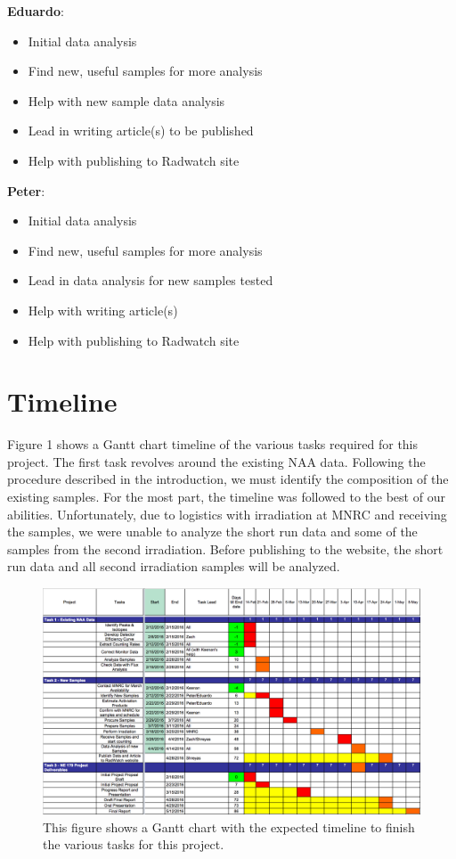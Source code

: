 \documentclass[]{article}
\begin{document}
\textbf{Eduardo}:
\begin{itemize}
\item Initial data analysis
\item Find new, useful samples for more analysis
\item Help with new sample data analysis
\item Lead in writing article(s) to be published
\item Help with publishing to Radwatch site
\end{itemize}

\textbf{Peter}:
\begin{itemize}
\item Initial data analysis
\item Find new, useful samples for more analysis
\item Lead in data analysis for new samples tested
\item Help with writing article(s)
\item Help with publishing to Radwatch site
\end{itemize}

\pagebreak

\section{Timeline}

Figure 1 shows a Gantt chart timeline of the various tasks required for this project. The first task revolves around the existing NAA data. Following the procedure described in the introduction, we must identify the composition of the existing samples. For the most part, the timeline was followed to the best of our abilities. Unfortunately, due to logistics with irradiation at MNRC and receiving the samples, we were unable to analyze the short run data and some of the samples from the second irradiation. Before publishing to the website, the short run data and all second irradiation samples will be analyzed. 

\begin{figure}[h]
\centering
\includegraphics[scale=0.4]{GanttChart}
\caption{This figure shows a Gantt chart with the expected timeline to finish the various tasks for this project.}
\end{figure} 
\end{document}
